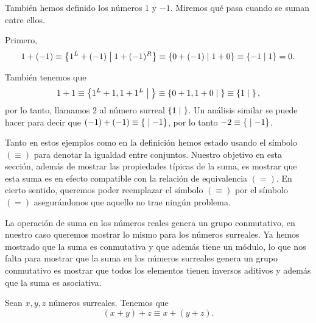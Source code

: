     \begin{example}
        Tambi\'en hemos definido los n\'umeros $1$ y $-1$. Miremos qu\'e pasa cuando se suman entre ellos.

        Primero,
        \[
            1 + (-1) \equiv \left\{1^L + (-1)\;\middle|\; 1+(-1)^R\right\} \equiv \left\{0+(-1)\;\middle|\; 1+0\right\} \equiv \left\{-1\;\middle|\; 1\right\} = 0.
        \]

        Tambi\'en tenemos que
        \[
            1 + 1 \equiv \left\{1^L+1, 1+1^L\;\middle|\; \right\} \equiv \left\{0+1,1+0\;\middle|\; \right\} \equiv \left\{1\;\middle|\; \right\},
        \]
        por lo tanto, llamamos $2$ al n\'umero surreal $\left\{1\;\middle|\; \right\}$. Un an\'alisis similar se puede hacer para decir que $(-1)+(-1) \equiv \left\{\;\middle|\; -1\right\}$, por lo tanto $-2 \equiv \left\{\;\middle|\; -1\right\}$.
    \end{example}

    Tanto en estos ejemplos como en la definici\'on hemos estado usando el s\'imbolo $(\equiv)$ para denotar la igualdad entre conjuntos. Nuestro objetivo en esta secci\'on, adem\'as de mostrar las propiedades t\'ipicas de la suma, es mostrar que esta suma es en efecto compatible con la relaci\'on de equivalencia $(=)$. En cierto sentido, queremos poder reemplazar el s\'imbolo $(\equiv)$ por el s\'imbolo $(=)$ asegur\'andonos que aquello no trae ning\'un problema.

    La operaci\'on de suma en los n\'umeros reales genera un grupo conmutativo, en nuestro caso queremos mostrar lo mismo para los n\'umeros surreales. Ya hemos mostrado que la suma es conmutativa y que adem\'as tiene un m\'odulo, lo que nos falta para mostrar que la suma en los n\'umeros surreales genera un grupo conmutativo es mostrar que todos los elementos tienen inversos aditivos y adem\'as que la suma es asociativa.

    \begin{theorem}
        Sean $x, y, z$ n\'umeros surreales. Tenemos que
        \[
            (x+y)+z \equiv x+(y+z).
        \]
    \end{theorem}

